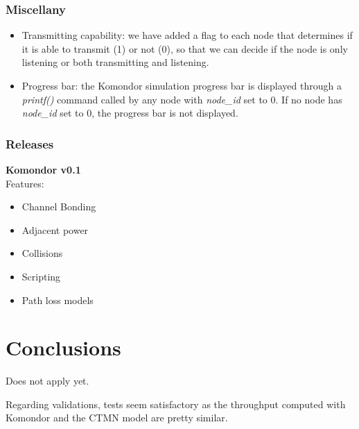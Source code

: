 \documentclass[a4paper]{article}
\begin{document}
		\subsubsection{Miscellany}
		\begin{itemize}
		\item Transmitting capability: we have added a flag to each node that determines if it is able to transmit (1) or not (0), so that we can decide if the node is only listening or both transmitting and listening.
		\item Progress bar: the Komondor simulation progress bar is displayed through a \textit{printf()} command called by any node with \textit{node\_id} set to 0. If no node has \textit{node\_id} set to 0, the progress bar is not displayed.
		\end{itemize}

		\subsubsection{Releases}

		\textbf{Komondor v0.1}\\
		Features:
		\begin{itemize}
		\item Channel Bonding
		\item Adjacent power
		\item Collisions
		\item Scripting
		\item Path loss models
		\end{itemize}


\section{Conclusions}
Does not apply yet.

Regarding validations, tests seem satisfactory as the throughput computed with Komondor and the CTMN model are pretty similar.



\end{document}
